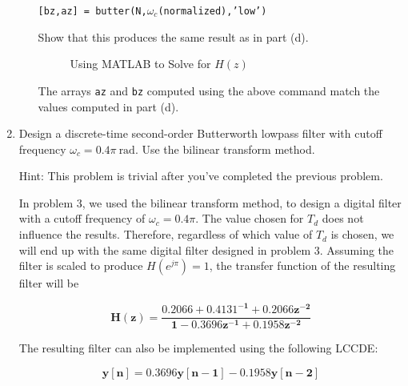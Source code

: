 \documentclass[fleqn]{article}
\begin{document}
\begin{enumerate}[nolistsep]
\begin{enumerate}
			\texttt{[bz,az] = butter(N,$\omega_c$(normalized),'low')}
			
			Show that this produces the same result as in part (d).
			
			\begin{figure}[H]
					\centerline{}
					\caption{Using MATLAB to Solve for $H(z)$}
			\end{figure}
				
			The arrays \texttt{az} and \texttt{bz} computed using the above command match the values computed in part (d).
		\end{enumerate}
		
		\item Design a discrete-time second-order Butterworth lowpass filter with cutoff frequency $\omega_c = 0.4\pi\ \text{rad}$. Use the bilinear transform method.
		
		Hint: This problem is trivial after you've completed the previous problem.
		
		In problem 3, we used the bilinear transform method, to design a digital filter with a cutoff frequency of $\omega_c = 0.4\pi$. The value chosen for $T_d$ does not influence the results. Therefore, regardless of which value of $T_d$ is chosen, we will end up with the same digital filter designed in problem 3. Assuming the filter is scaled to produce $H(e^{j\pi}) = 1$, the transfer function of the resulting filter will be
		
		\begin{equation*}
			\mathbf{H(z) = \frac{0.2066 + 0.4131^{-1} + 0.2066z^{-2}}{1 - 0.3696z^{-1} + 0.1958z^{-2}}}
		\end{equation*}
		
		The resulting filter can also be implemented using the following LCCDE:
		
		\begin{equation*}
			\mathbf{y[n] = 0.3696y[n-1] - 0.1958y[n-2]}
		\end{equation*}
			

\end{enumerate}
\end{document}
